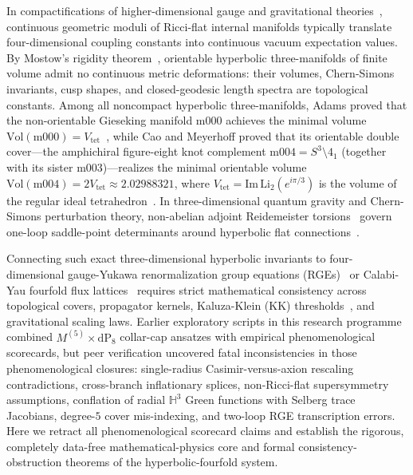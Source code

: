 \documentclass[aps,prd,twocolumn,nofootinbib,floatfix]{revtex4-2}
\begin{document}
In compactifications of higher-dimensional gauge and gravitational theories~\cite{Hosotani1983,HoravaWitten1996,HallNomura2001,SvrcekWitten2006}, continuous geometric moduli of Ricci-flat internal manifolds typically translate four-dimensional coupling constants into continuous vacuum expectation values.
By Mostow's rigidity theorem~\cite{Mostow1968}, orientable hyperbolic three-manifolds of finite volume admit no continuous metric deformations: their volumes, Chern-Simons invariants, cusp shapes, and closed-geodesic length spectra are topological constants.
Among all noncompact hyperbolic three-manifolds, Adams proved that the non-orientable Gieseking manifold $\mathrm{m000}$ achieves the minimal volume $\mathrm{Vol}(\mathrm{m000}) = V_{\mathrm{tet}}$~\cite{Adams1987}, while Cao and Meyerhoff proved that its orientable double cover---the amphichiral figure-eight knot complement $\mathrm{m004} = S^3 \setminus 4_1$ (together with its sister $\mathrm{m003}$)---realizes the minimal orientable volume $\mathrm{Vol}(\mathrm{m004}) = 2 V_{\mathrm{tet}} \approx 2.02988321$, where $V_{\mathrm{tet}} = \mathrm{Im}\,\mathrm{Li}_2(e^{i\pi/3})$ is the volume of the regular ideal tetrahedron~\cite{CaoMeyerhoff2001}.
In three-dimensional quantum gravity and Chern-Simons perturbation theory, non-abelian adjoint Reidemeister torsions~\cite{Wada1994,Porti1997,DuboisYamaguchi2009} govern one-loop saddle-point determinants around hyperbolic flat connections~\cite{GiombiMaloneyYin2008}.

Connecting such exact three-dimensional hyperbolic invariants to four-dimensional gauge-Yukawa renormalization group equations (RGEs)~\cite{MachacekVaughn1984,LuoXiao2003,Buttazzo2013,Antusch2001} or Calabi-Yau fourfold flux lattices~\cite{KlemmLianRoanYau1997,GukovVafaWitten2000,BoussoPolchinski2000} requires strict mathematical consistency across topological covers, propagator kernels, Kaluza-Klein (KK) thresholds~\cite{ContinoPilo2001}, and gravitational scaling laws.
Earlier exploratory scripts in this research programme combined $M^{(5)}\times \mathrm{dP}_8$ collar-cap ansatzes with empirical phenomenological scorecards, but peer verification uncovered fatal inconsistencies in those phenomenological closures: single-radius Casimir-versus-axion rescaling contradictions, cross-branch inflationary splices, non-Ricci-flat supersymmetry assumptions, conflation of radial $\mathbb{H}^3$ Green functions with Selberg trace Jacobians, degree-$5$ cover mis-indexing, and two-loop RGE transcription errors.
Here we retract all phenomenological scorecard claims and establish the rigorous, completely data-free mathematical-physics core and formal consistency-obstruction theorems of the hyperbolic-fourfold system.
\end{document}
